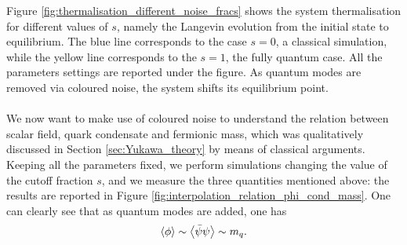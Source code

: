 Figure \ref{fig:thermalisation_different_noise_fracs} shows the system thermalisation for different values of $s$, namely the Langevin evolution from the initial state to equilibrium. The blue line corresponds to the case $s=0$, a classical simulation, while the yellow line corresponds to the $s=1$, the fully quantum case.  All the parameters settings are reported under the figure. As quantum modes are removed via coloured noise, the system shifts its equilibrium point. \\~\\ 
We now want to make use of coloured noise to understand the relation between scalar field, quark condensate and fermionic mass, which was qualitatively discussed in Section \ref{sec:Yukawa_theory} by means of classical arguments. \\
Keeping all the parameters fixed, we perform simulations changing the value of the cutoff fraction $s$, and we measure the three quantities mentioned above: the results are reported in Figure \ref{fig:interpolation_relation_phi_cond_mass}. 
One can clearly see that as quantum modes are added, one has
\begin{equation*}
	\left\langle \phi \right\rangle \sim \left\langle \bar\psi\psi \right\rangle \sim m_q.
\end{equation*}
